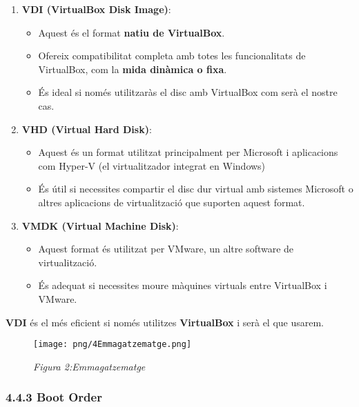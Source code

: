 \documentclass[
  12 pt,
  a4paper,
]{article}
\providecommand{\tightlist}{%
  \setlength{\itemsep}{0pt}\setlength{\parskip}{0pt}}
\begin{document}
\begin{enumerate}
\def\labelenumi{\arabic{enumi}.}
\tightlist
\item
  \textbf{VDI (VirtualBox Disk Image)}:

  \begin{itemize}
  \tightlist
  \item
    Aquest és el format \textbf{natiu de VirtualBox}.
  \item
    Ofereix compatibilitat completa amb totes les funcionalitats de
    VirtualBox, com la \textbf{mida dinàmica o fixa}.
  \item
    És ideal si només utilitzaràs el disc amb VirtualBox com serà el
    nostre cas.
  \end{itemize}
\item
  \textbf{VHD (Virtual Hard Disk)}:

  \begin{itemize}
  \tightlist
  \item
    Aquest és un format utilitzat principalment per Microsoft i
    aplicacions com Hyper-V (el virtualitzador integrat en Windows)
  \item
    És útil si necessites compartir el disc dur virtual amb sistemes
    Microsoft o altres aplicacions de virtualització que suporten aquest
    format.
  \end{itemize}
\item
  \textbf{VMDK (Virtual Machine Disk)}:

  \begin{itemize}
  \tightlist
  \item
    Aquest format és utilitzat per VMware, un altre software de
    virtualització.
  \item
    És adequat si necessites moure màquines virtuals entre VirtualBox i
    VMware.
  \end{itemize}
\end{enumerate}

\textbf{VDI} és el més eficient si només utilitzes \textbf{VirtualBox} i
serà el que usarem.

\begin{figure}
\centering
\texttt{[image: png/4Emmagatzematge.png]}
\caption{\emph{Figura 2:Emmagatzematge}}
\end{figure}

\subsubsection{4.4.3 Boot Order}\label{boot-order}
\end{document}
